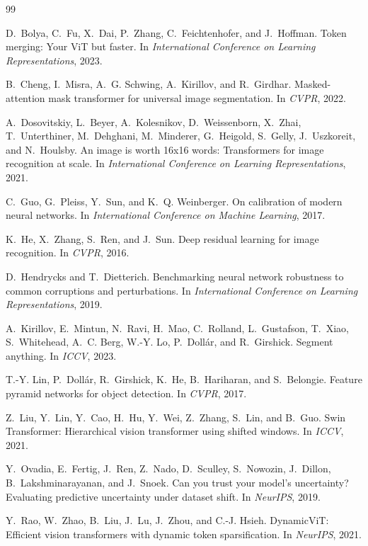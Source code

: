 \documentclass[10pt,twocolumn,letterpaper]{article}
\begin{document}
\begin{thebibliography}{99}
\small

D.~Bolya, C.~Fu, X.~Dai, P.~Zhang, C.~Feichtenhofer, and J.~Hoffman.
\newblock Token merging: Your {ViT} but faster.
\newblock In \emph{International Conference on Learning Representations}, 2023.

B.~Cheng, I.~Misra, A.~G. Schwing, A.~Kirillov, and R.~Girdhar.
\newblock Masked-attention mask transformer for universal image segmentation.
\newblock In \emph{CVPR}, 2022.

A.~Dosovitskiy, L.~Beyer, A.~Kolesnikov, D.~Weissenborn, X.~Zhai,
T.~Unterthiner, M.~Dehghani, M.~Minderer, G.~Heigold, S.~Gelly, J.~Uszkoreit,
and N.~Houlsby.
\newblock An image is worth 16x16 words: Transformers for image recognition at scale.
\newblock In \emph{International Conference on Learning Representations}, 2021.

C.~Guo, G.~Pleiss, Y.~Sun, and K.~Q. Weinberger.
\newblock On calibration of modern neural networks.
\newblock In \emph{International Conference on Machine Learning}, 2017.

K.~He, X.~Zhang, S.~Ren, and J.~Sun.
\newblock Deep residual learning for image recognition.
\newblock In \emph{CVPR}, 2016.

D.~Hendrycks and T.~Dietterich.
\newblock Benchmarking neural network robustness to common corruptions and perturbations.
\newblock In \emph{International Conference on Learning Representations}, 2019.

A.~Kirillov, E.~Mintun, N.~Ravi, H.~Mao, C.~Rolland, L.~Gustafson, T.~Xiao,
S.~Whitehead, A.~C. Berg, W.-Y. Lo, P.~Doll\'{a}r, and R.~Girshick.
\newblock Segment anything.
\newblock In \emph{ICCV}, 2023.

T.-Y. Lin, P.~Doll\'{a}r, R.~Girshick, K.~He, B.~Hariharan, and S.~Belongie.
\newblock Feature pyramid networks for object detection.
\newblock In \emph{CVPR}, 2017.

Z.~Liu, Y.~Lin, Y.~Cao, H.~Hu, Y.~Wei, Z.~Zhang, S.~Lin, and B.~Guo.
\newblock Swin Transformer: Hierarchical vision transformer using shifted windows.
\newblock In \emph{ICCV}, 2021.

Y.~Ovadia, E.~Fertig, J.~Ren, Z.~Nado, D.~Sculley, S.~Nowozin, J.~Dillon,
B.~Lakshminarayanan, and J.~Snoek.
\newblock Can you trust your model's uncertainty? Evaluating predictive uncertainty under dataset shift.
\newblock In \emph{NeurIPS}, 2019.

Y.~Rao, W.~Zhao, B.~Liu, J.~Lu, J.~Zhou, and C.-J. Hsieh.
\newblock DynamicViT: Efficient vision transformers with dynamic token sparsification.
\newblock In \emph{NeurIPS}, 2021.

\end{thebibliography}
\end{document}
